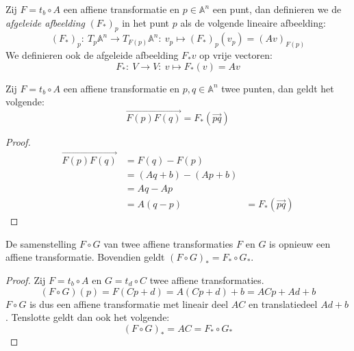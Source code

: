 \documentclass[main.tex]{subfiles}
\begin{document}
\begin{de}
  Zij $F = t_{b} \circ A$ een affiene transformatie en $p\in \mathbb{A}^{n}$ een punt, dan definieren we de \emph{afgeleide afbeelding} $(F_{*})_{p}$ in het punt $p$ als de volgende lineaire afbeelding:
  \[ (F_{*})_{p}:\ T_{p}\mathbb{A}^{n} \rightarrow T_{F(p)}\mathbb{A}^{n}:\ v_{p} \mapsto (F_{*})_{p}(v_{p}) = (Av)_{F(p)} \]
  We definieren ook de afgeleide afbeelding $F_{*}v$ op vrije vectoren:
  \[ F_{*}:\ V\rightarrow V:\ v\mapsto F_{*}(v) = Av \]
\end{de}

\begin{st}
  Zij $F = t_{b} \circ A$ een affiene transformatie en $p,q \in \mathbb{A}^{n}$ twee punten, dan geldt het volgende:
  \[ \overrightarrow{F(p)F(q)} = F_{*}(\overrightarrow{pq}) \]

  \begin{proof}
    \[
    \begin{array}{rll}
      \overrightarrow{F(p)F(q)} &= F(q) - F(p) &\\
                                &= (Aq+b) - (Ap+b) &\\
                                &= Aq - Ap &\\
                                &= A(q-p) &= F_{*}(\overrightarrow{pq})
    \end{array}
    \]
  \end{proof}
\end{st}

\begin{st}
  \label{st:samenstelling-affiene-transformatie-intern}
  De samenstelling $F\circ G$ van twee affiene transformaties $F$ en $G$ is opnieuw een affiene transformatie.
  Bovendien geldt $(F\circ G)_{*} = F_{*} \circ G_{*}$.

  \begin{proof}
    Zij $F = t_{b} \circ A$ en $G = t_{d} \circ C$ twee affiene transformaties.
    \[ (F\circ G)(p) = F(Cp + d) = A(Cp + d) + b = ACp + Ad + b \]
    $F\circ G$ is dus een affiene transformatie met lineair deel $AC$ en translatiedeel $Ad + b$.
    Tenslotte geldt dan ook het volgende:
    \[ (F\circ G)_{*} = AC = F_{*} \circ G_{*} \]
  \end{proof}
\end{st}
\end{document}
